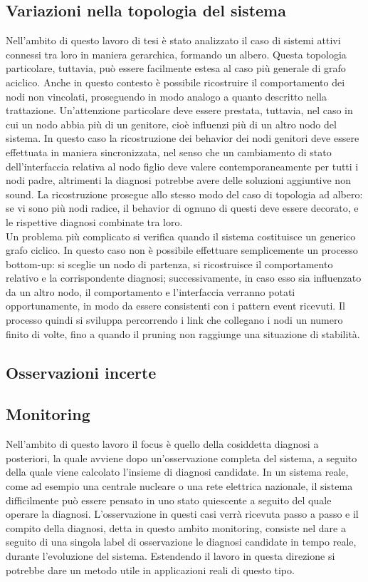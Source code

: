 \subsection{Variazioni nella topologia del sistema}
Nell'ambito di questo lavoro di tesi è stato analizzato il caso di sistemi attivi connessi tra loro in maniera gerarchica, formando un albero. Questa topologia particolare, tuttavia, può essere facilmente estesa al caso più generale di grafo aciclico. Anche in questo contesto è possibile ricostruire il comportamento dei nodi non vincolati, proseguendo in modo analogo a quanto descritto nella trattazione. Un'attenzione particolare deve essere prestata, tuttavia, nel caso in cui un nodo abbia più di un genitore, cioè influenzi più di un altro nodo del sistema. In questo caso la ricostruzione dei behavior dei nodi genitori deve essere effettuata in maniera sincronizzata, nel senso che un cambiamento di stato dell'interfaccia relativa al nodo figlio deve valere contemporaneamente  per tutti i nodi padre, altrimenti la diagnosi potrebbe avere delle soluzioni aggiuntive non sound. La ricostruzione prosegue allo stesso modo del caso di topologia ad albero: se vi sono più nodi radice, il behavior di ognuno di questi deve essere decorato, e le rispettive diagnosi combinate tra loro.\\
Un problema più complicato si verifica quando il sistema costituisce un generico grafo ciclico. In questo caso non è possibile effettuare semplicemente un processo bottom-up: si sceglie un nodo di partenza, si ricostruisce il comportamento relativo e la corrispondente diagnosi; successivamente, in caso esso sia influenzato da un altro nodo, il comportamento e l'interfaccia verranno potati opportunamente, in modo da essere consistenti con i pattern event ricevuti. Il processo quindi si sviluppa percorrendo i link che collegano i nodi un numero finito di volte, fino a quando il pruning non raggiunge una situazione di stabilità. 

\subsection{Osservazioni incerte}

\subsection{Monitoring}
Nell'ambito di questo lavoro il focus è quello della cosiddetta diagnosi a posteriori, la quale avviene dopo un'osservazione completa del sistema, a seguito della quale viene calcolato l'insieme di diagnosi candidate. In un sistema reale, come ad esempio una centrale nucleare o una rete elettrica nazionale, il sistema difficilmente può essere pensato in uno stato quiescente a seguito del quale operare la diagnosi. L'osservazione in questi casi verrà ricevuta passo a passo e il compito della diagnosi, detta in questo ambito monitoring, consiste nel dare a seguito di una singola label di osservazione le diagnosi candidate in tempo reale, durante l'evoluzione del sistema. Estendendo il lavoro in questa direzione si potrebbe dare un metodo utile in applicazioni reali di questo tipo.